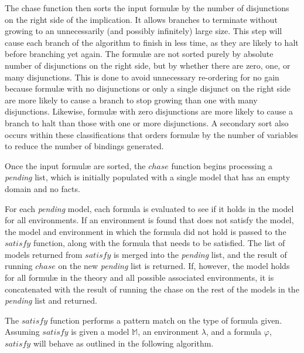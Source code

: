 	The chase function then sorts the input formul{\ae} by the number of
	disjunctions on the right side of the implication. It allows branches to
	terminate without growing to an unnecessarily (and possibly infinitely)
	large size. This step will cause each branch of the algorithm to finish in
	less time, as they are likely to halt before branching yet again. The
	formul{\ae} are not sorted purely by absolute number of disjunctions on the
	right side, but by whether there are zero, one, or many disjunctions. This
	is done to avoid unnecessary re-ordering for no gain because formul{\ae}
	with no disjunctions or only a single disjunct on the right side are more
	likely to cause a branch to stop growing than one with many disjunctions.
	Likewise, formul{\ae} with zero disjunctions are more likely to cause a
	branch to halt than those with one or more disjunctions. A secondary sort
	also occurs within these classifications that orders formul{\ae} by the
	number of variables to reduce the number of bindings generated.

	Once the input formul{\ae} are sorted, the $chase$ function begins
	processing a \emph{pending} list, which is initially populated with a
	single model that has an empty domain and no facts.

	For each \emph{pending} model, each formula is evaluated to see if it holds
	in the model for all environments. If an environment is found that does not
	satisfy the model, the model and environment in which the formula did not
	hold is passed to the $satisfy$ function, along with the formula that needs
	to be satisfied. The list of models returned from $satisfy$ is merged into
	the \emph{pending} list, and the result of running $chase$ on the new
	\emph{pending} list is returned. If, however, the model holds for all
	formul{\ae} in the theory and all possible associated environments, it is
	concatenated with the result of running the chase on the rest of the models
	in the \emph{pending} list and returned.

	The $satisfy$ function performs a pattern match on the type of formula
	given. Assuming $satisfy$ is given a model $\mathbb{M}$, an environment
	$\lambda$, and a formula $\varphi$, $satisfy$ will behave as outlined
	in the following algorithm.

	~\\

